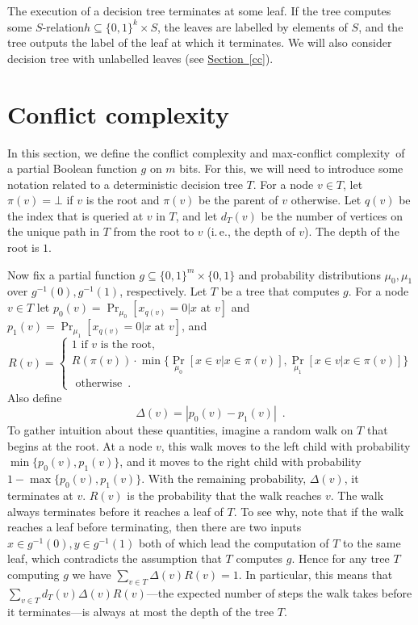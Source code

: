 \documentclass[11pt]{article}
\numberwithin{equation}{section}
\theoremstyle{definition}
\theoremstyle{plain}
\newcommand{\ie}{i.\,e.}
\newcommand{\expref}[2]{\hyperref[#2]{#1~\ref{#2}}}
\newcommand{\relation}{$S$-relation\xspace}     %
\newcommand{\ccc}{max-conflict complexity}
\begin{document}
The execution of a decision tree terminates at some leaf. If the tree computes some \relation $h \subseteq \{0,1\}^k \times S$, the leaves are labelled by elements of $S$, and the tree outputs the label of the leaf at which it terminates. We will also consider decision tree with unlabelled leaves (see \expref{Section}{cc}).
%

\section{Conflict complexity}  
\label{sec:conflict}
In this section, we define the conflict complexity and \ccc \ of a partial Boolean function $g$ on $m$ bits.  For this, we will need to introduce some notation related to a deterministic decision tree $T$.  
For a node $v \in T$, let $\pi(v) = \bot$ if $v$ is the root and $\pi(v)$ be the parent of $v$ otherwise.  Let $q(v)$ be the index that 
is queried at $v$ in $T$, and let $d_T(v)$ be the number of vertices on the unique path in $T$ from the root to $v$ (\ie, the depth of $v$). The depth of the root is $1$.

Now fix a partial function $g \subseteq \{0,1\}^m \times \{0,1\}$ and probability distributions $\mu_0, \mu_1$ over $g^{-1}(0), g^{-1}(1)$, respectively.  Let $T$ 
be a tree that computes $g$.  For a node $v \in T$ let $p_0(v) =  \Pr_{\mu_0}[x_{q(v)}=0 | x \mbox{ at } v]$ and $p_1(v) = \Pr_{\mu_1}[x_{q(v)}=0 | x \mbox{ at } v]$, and 
\[
R(v) = 
\begin{cases}
1\mbox{ \ \ \ \ \ \ \ \ \ \ \ \ \ \ \ \ \ \ \ \ \ if } v \mbox{ is the root,} \\
R(\pi(v))\cdot \min\{\Pr_{\mu_0}[x \in v | x \in \pi(v)], \Pr_{\mu_1}[x \in v | x \in \pi(v)]\} \\
\mbox{\ \ \ \ \ \ \ \ \ \ \ \ \ \ \ \ \ \ \ \ \ \ \ \ otherwise}\enspace.
\end{cases}
\]
Also define
\[
\Delta(v) = |p_0(v) -  p_1(v)| \enspace .
\]
To gather intuition about these quantities, imagine a random walk on $T$ that begins at the root.  At a node $v$, this walk moves to the left child with probability 
$\min\{p_0(v), p_1(v) \}$, and it moves to the right child with probability 
$1- \max\{p_0(v), p_1(v) \}$.  With the remaining probability, $\Delta(v)$, it terminates at $v$. $R(v)$ is the probability that the walk reaches $v$.
The walk always terminates before it reaches a leaf of $T$. To see why, note that if the walk reaches a leaf before terminating, then there are two inputs $x \in g^{-1}(0), y \in g^{-1}(1)$ both of which lead the computation of $T$ to the same leaf, which contradicts the assumption that $T$ computes $g$. Hence for any tree $T$ computing $g$ we have $\sum_{v \in T} \Delta(v) R(v)=1$.
In particular, this means that $\sum_{v \in T} d_T(v) \Delta(v) R(v)$---the expected number of steps the walk takes before it terminates---is always at most the depth 
of the tree $T$.
\end{document}
